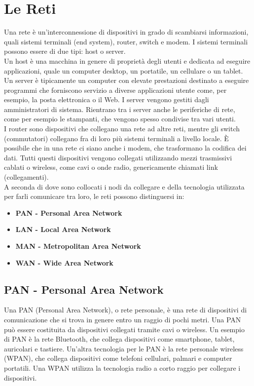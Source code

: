 \documentclass[12pt]{report}
\begin{document}
	\section{Le Reti}
	Una rete è un'interconnessione di dispositivi in grado di scambiarsi informazioni, quali sistemi terminali (end system), router, switch e modem. I sistemi terminali possono essere di due tipi: host o server. 
	\vspace{\baselineskip}\\
	Un host è una macchina in genere di proprietà degli utenti e dedicata ad eseguire applicazioni, quale un computer desktop, un portatile, un cellulare o un tablet.
	Un server è tipicamente un computer con elevate prestazioni destinato a eseguire programmi che forniscono servizio a diverse applicazioni utente come, per esempio, la posta elettronica o il Web. I server vengono gestiti dagli amministratori di sistema. Rientrano tra i server anche le periferiche di rete, come per esempio le stampanti, che vengono spesso condivise tra vari utenti. 
	\vspace{\baselineskip}\\
	I router sono dispositivi che collegano una rete ad altre reti, mentre gli switch (commutatori) collegano fra di loro più sistemi terminali a livello locale. È possibile che in una rete ci siano anche i modem, che trasformano la codifica dei dati. Tutti questi dispositivi vengono collegati utilizzando mezzi trasmissivi cablati o wireless, come cavi o onde radio, genericamente chiamati link (collegamenti).
	\vspace{\baselineskip}\\
	A seconda di dove sono collocati i nodi da collegare e della tecnologia utilizzata per farli comunicare tra loro, le reti possono distinguersi in:
	\begin{itemize}
		\item \textbf{PAN - Personal Area Network}
		\item \textbf{LAN - Local Area Network}
		\item \textbf{MAN - Metropolitan Area Network}
		\item \textbf{WAN - Wide Area Network}
	\end{itemize}

	\subsection{PAN - Personal Area Network}
	Una PAN (Personal Area Network), o rete personale, è una rete di dispositivi di comunicazione che si trova in genere entro un raggio di pochi metri. Una PAN può essere costituita da dispositivi collegati tramite cavi o wireless. Un esempio di PAN è la rete Bluetooth, che collega dispositivi come smartphone, tablet, auricolari e tastiere. Un'altra tecnologia per le PAN è la rete personale wireless (WPAN), che collega dispositivi come telefoni cellulari, palmari e computer portatili. Una WPAN utilizza la tecnologia radio a corto raggio per collegare i dispositivi.
\end{document}

